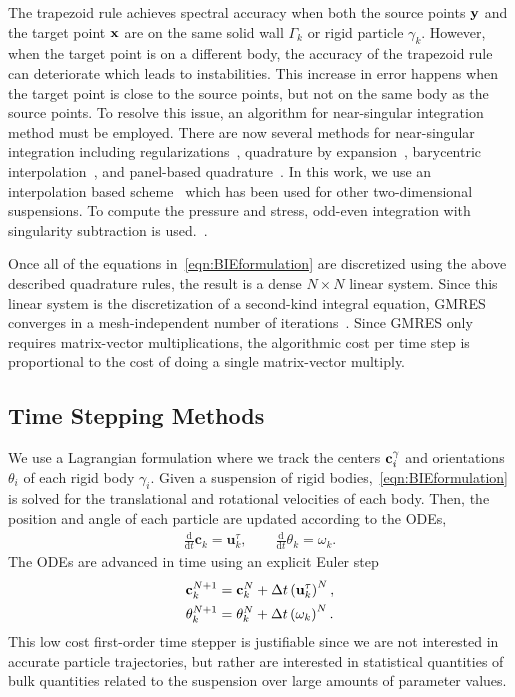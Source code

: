 \documentclass[preprint, 10pt]{elsarticle}
\begin{document}
The trapezoid rule achieves spectral accuracy when both the source
points ${\mathbf{y}}$ and the target point ${\mathbf{x}}$ are on the same solid wall
$\Gamma_k$ or rigid particle $\gamma_k$.  However, when the target point
is on a different body, the accuracy of the trapezoid rule can
deteriorate which leads to instabilities.  This increase in error
happens when the target point is close to the source points, but not on
the same body as the source points.  To resolve this issue, an algorithm
for near-singular integration method must be employed.  There are now
several methods for near-singular integration including
regularizations~\cite{Beale2001}, quadrature by
expansion~\cite{Klockner2013}, barycentric
interpolation~\cite{Barnett2015}, and panel-based
quadrature~\cite{Helsing2008}.  In this work, we use an interpolation
based scheme~\cite{Ying2006} which has been used for other
two-dimensional suspensions.  To compute the pressure and stress, odd-even integration with singularity subtraction is used.~\cite{Quaife2014}.

Once all of the equations in~\eqref{eqn:BIEformulation} are discretized
using the above described quadrature rules, the result is a dense $N
\times N$ linear system.  Since this linear system is the discretization
of a second-kind integral equation, GMRES~\cite{Saad1986} converges in a
mesh-independent number of iterations~\cite{Campbell1996}.  Since GMRES
only requires matrix-vector multiplications, the algorithmic cost per
time step is proportional to the cost of doing a single matrix-vector
multiply.


\subsection{Time Stepping Methods}
\label{sec:temporal}

We use a Lagrangian formulation where we track the centers
${\mathbf{c}}_i^\gamma$ and orientations $\theta_i$ of each rigid body
$\gamma_i$. Given a suspension of rigid
bodies,~\eqref{eqn:BIEformulation} is solved for the translational and
rotational velocities of each body. Then, the position and angle of each
particle are updated according to the ODEs,
\begin{align*}
  \frac{\text{d}}{\text{d}t}\mathbf{c}_k = \mathbf{u}^\tau_k, \qquad
  \frac{\text{d}}{\text{d}t}\theta_k =\omega_k.
\end{align*}
The ODEs are advanced in time using an explicit Euler step
\begin{align*}
  {\mathbf{c}}_k^{N+1} &= {\mathbf{c}}_k^N + \Delta t \left({\mathbf{u}}_k^\tau\right)^N, \\
  \theta_k^{N+1} &= \theta_k^N + \Delta t \left(\omega_k\right)^N.
\end{align*}
This low cost first-order time stepper is justifiable since we are
not interested in accurate particle trajectories, but rather are
interested in statistical quantities of bulk quantities related to the
suspension over large amounts of parameter values.
\end{document}
